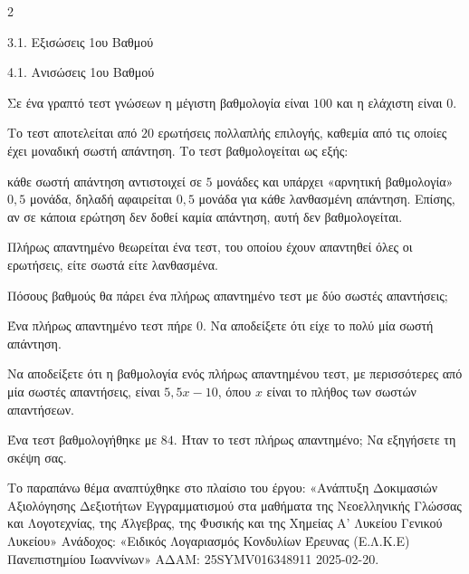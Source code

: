 \begin{ylh}{2}
    \item 3.1. Εξισώσεις 1ου Βαθμού
    \item 4.1. Ανισώσεις 1ου Βαθμού
\end{ylh}
Σε ένα γραπτό τεστ γνώσεων η μέγιστη βαθμολογία είναι $100$ και η ελάχιστη είναι $0$.

Το τεστ αποτελείται από $20$ ερωτήσεις πολλαπλής επιλογής, καθεμία από τις οποίες έχει μοναδική σωστή απάντηση. Το τεστ βαθμολογείται ως εξής:

κάθε σωστή απάντηση αντιστοιχεί σε $5$ μονάδες και υπάρχει «αρνητική βαθμολογία» $0,5$ μονάδα, δηλαδή αφαιρείται $0,5$ μονάδα για κάθε λανθασμένη απάντηση. Επίσης, αν σε κάποια ερώτηση δεν δοθεί καμία απάντηση, αυτή δεν βαθμολογείται.

Πλήρως απαντημένο θεωρείται ένα τεστ, του οποίου έχουν απαντηθεί όλες οι ερωτήσεις, είτε σωστά είτε λανθασμένα.

\begin{alist}
\item Πόσους βαθμούς θα πάρει ένα πλήρως απαντημένο τεστ με δύο σωστές απαντήσεις;
\item

\begin{rlist}
\item Ένα πλήρως απαντημένο τεστ πήρε $0$. Να αποδείξετε ότι είχε το πολύ μία σωστή απάντηση.
\item Να αποδείξετε ότι η βαθμολογία ενός πλήρως απαντημένου τεστ, με περισσότερες από μία σωστές απαντήσεις, είναι $5,5x - 10$, όπου $x$ είναι το πλήθος των σωστών απαντήσεων.
\item Ένα τεστ βαθμολογήθηκε με $84$. Ήταν το τεστ πλήρως απαντημένο; Να εξηγήσετε τη σκέψη σας.

{\footnotesize Το παραπάνω θέμα αναπτύχθηκε στο πλαίσιο του έργου: «Ανάπτυξη Δοκιμασιών Αξιολόγησης Δεξιοτήτων Εγγραμματισμού στα μαθήματα της Νεοελληνικής Γλώσσας και Λογοτεχνίας, της Άλγεβρας, της Φυσικής και της Χημείας Α' Λυκείου Γενικού Λυκείου» Ανάδοχος: «Ειδικός Λογαριασμός Κονδυλίων Έρευνας (Ε.Λ.Κ.Ε) Πανεπιστημίου Ιωαννίνων» ΑΔΑΜ: 25SYMV016348911 2025-02-20.}
\end{rlist}
\end{alist}

